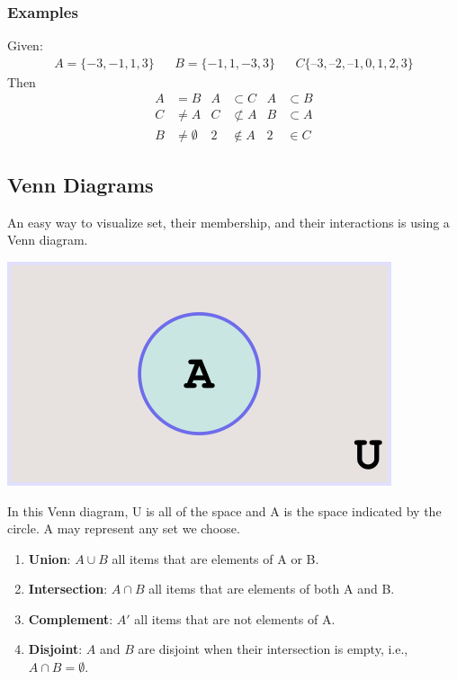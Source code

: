 \documentclass[14pt]{extarticle}
\begin{document}
\subsubsection{Examples}
Given:
\begin{align*}
	A = \{-3,-1,1,3\} & & B=\{-1,1,-3,3\} & & C  \{–3, –2, –1, 0, 1, 2, 3\}
\end{align*}
Then
\begin{align*}
	A &= B & A &\subset C & A &\subset B \\
	C &\neq A & C &\not\subset A & B &\subset A \\
	B &\neq \emptyset & 2 &\notin A & 2 &\in C
\end{align*}

\subsection{Venn Diagrams}
An easy way to visualize set, their membership, and their interactions is using a Venn diagram.
\begin{center}
	\includegraphics[width=0.5\linewidth]{venn-1}
\end{center}
In this Venn diagram, U is all of the space and A is the space indicated by the circle. A may represent any set we choose.

\begin{tcolorbox}[enhanced jigsaw,colback=bg,boxrule=0pt,arc=0pt] 
	\begin{enumerate}
		\item \textbf{Union}: $A \cup B$ all items that are elements of A or B.
		\item \textbf{Intersection}: $A \cap B$ all items that are elements of both A and B.
		\item \textbf{Complement}: $A'$ all items that are not elements of A.
		\item \textbf{Disjoint}: $A$ and $B$ are disjoint when their intersection is empty, i.e., $A \cap B = \emptyset$.
	\end{enumerate}
\end{tcolorbox}
\end{document}
